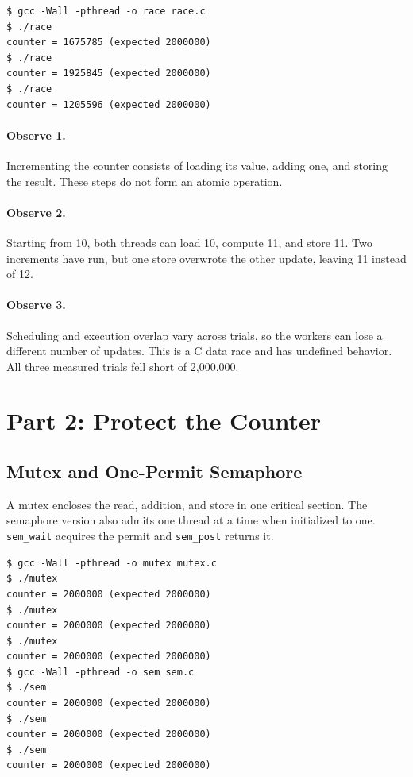 \documentclass[12pt,a4paper]{article}
\begin{document}
\begin{lstlisting}[caption={Three trials without synchronization}]
$ gcc -Wall -pthread -o race race.c
$ ./race
counter = 1675785 (expected 2000000)
$ ./race
counter = 1925845 (expected 2000000)
$ ./race
counter = 1205596 (expected 2000000)
\end{lstlisting}

\paragraph{Observe 1.} Incrementing the counter consists of loading its value,
adding one, and storing the result. These steps do not form an atomic operation.

\paragraph{Observe 2.} Starting from 10, both threads can load 10, compute 11,
and store 11. Two increments have run, but one store overwrote the other update,
leaving 11 instead of 12.

\paragraph{Observe 3.} Scheduling and execution overlap vary across trials, so
the workers can lose a different number of updates. This is a C data race and has
undefined behavior. All three measured trials fell short of 2,000,000.

\section{Part 2: Protect the Counter}
\subsection{Mutex and One-Permit Semaphore}
A mutex encloses the read, addition, and store in one critical section. The
semaphore version also admits one thread at a time when initialized to one.
\texttt{sem\_wait} acquires the permit and \texttt{sem\_post} returns it.

\begin{lstlisting}[caption={Three correctness trials per lock}]
$ gcc -Wall -pthread -o mutex mutex.c
$ ./mutex
counter = 2000000 (expected 2000000)
$ ./mutex
counter = 2000000 (expected 2000000)
$ ./mutex
counter = 2000000 (expected 2000000)
$ gcc -Wall -pthread -o sem sem.c
$ ./sem
counter = 2000000 (expected 2000000)
$ ./sem
counter = 2000000 (expected 2000000)
$ ./sem
counter = 2000000 (expected 2000000)
\end{lstlisting}
\end{document}
